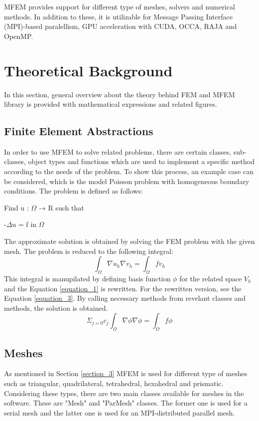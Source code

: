 \documentclass{article}
\begin{document}
MFEM provides support for different type of meshes, solvers and numerical methods. In addition to these, it is utilizable for Message Passing Interface (MPI)-based paralellism, GPU acceleration with CUDA, OCCA, RAJA and OpenMP. 
\label{section_3}

\section{Theoretical Background}
In this section, general overview about the theory behind FEM and MFEM library is provided with mathematical expressions and related figures. 
\subsection{Finite Element Abstractions}
In order to use MFEM to solve related problems, there are certain classes, sub-classes, object types and functions which are used to implement a specific method according to the needs of the problem. To show this process, an example case can be considered, which is the model Poisson problem with homogeneous boundary conditions. The problem is defined as follows:\par 
Find u : $\Omega$ → R such that \par
-$\Delta$u = f in $\Omega$ \par
The approximate solution is obtained by solving the FEM problem with the given mesh. The problem is reduced to the following integral:
\begin{equation}
    \int_{\Omega}^{} \nabla u_h \nabla v_h = \int_{\Omega}^{} f v_h
    \label{equation_1}
\end{equation}
This integral is manupilated by defining basis function $\phi$ for the related space $V_h$ and the Equation \ref{equation_1} is rewritten. For the rewritten version, see the Equation \ref{equation_3}. By calling necessary methods from revelant classes and methods, the solution is obtained. 
\begin{equation}
    \Sigma_{j=0} c_j \int_{\Omega}^{} \nabla \phi \nabla \phi = \int_{\Omega}^{} f \phi
    \label{equation_3}
\end{equation}

\subsection{Meshes}
As mentioned in Section \ref{section_3} MFEM is used for different type of meshes such as triangular, quadrilateral, tetrahedral, hexahedral and prismatic. Considering these types, there are two main classes available for meshes in the software. These are "Mesh" and "ParMesh" classes. The former one is used for a serial mesh and the latter one is used for an MPI-distributed parallel mesh.
\end{document}
